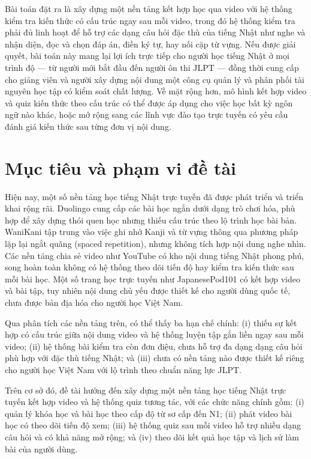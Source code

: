 \documentclass[../DoAn.tex]{subfiles}
\begin{document}
Bài toán đặt ra là xây dựng một nền tảng kết hợp học qua video với hệ thống kiểm tra kiến thức có cấu trúc ngay sau mỗi video, trong đó hệ thống kiểm tra phải đủ linh hoạt để hỗ trợ các dạng câu hỏi đặc thù của tiếng Nhật như nghe và nhận diện, đọc và chọn đáp án, điền ký tự, hay nối cặp từ vựng. Nếu được giải quyết, bài toán này mang lại lợi ích trực tiếp cho người học tiếng Nhật ở mọi trình độ — từ người mới bắt đầu đến người ôn thi JLPT — đồng thời cung cấp cho giảng viên và người xây dựng nội dung một công cụ quản lý và phân phối tài nguyên học tập có kiểm soát chất lượng. Về mặt rộng hơn, mô hình kết hợp video và quiz kiến thức theo cấu trúc có thể được áp dụng cho việc học bất kỳ ngôn ngữ nào khác, hoặc mở rộng sang các lĩnh vực đào tạo trực tuyến có yêu cầu đánh giá kiến thức sau từng đơn vị nội dung.

\section{Mục tiêu và phạm vi đề tài}
\label{section:1.2}

Hiện nay, một số nền tảng học tiếng Nhật trực tuyến đã được phát triển và triển khai rộng rãi. Duolingo cung cấp các bài học ngắn dưới dạng trò chơi hóa, phù hợp để xây dựng thói quen học nhưng thiếu cấu trúc theo lộ trình học bài bản. WaniKani tập trung vào việc ghi nhớ Kanji và từ vựng thông qua phương pháp lặp lại ngắt quãng (spaced repetition), nhưng không tích hợp nội dung nghe nhìn. Các nền tảng chia sẻ video như YouTube có kho nội dung tiếng Nhật phong phú, song hoàn toàn không có hệ thống theo dõi tiến độ hay kiểm tra kiến thức sau mỗi bài học. Một số trang học trực tuyến như JapanesePod101 có kết hợp video và bài tập, tuy nhiên nội dung chủ yếu được thiết kế cho người dùng quốc tế, chưa được bản địa hóa cho người học Việt Nam.

Qua phân tích các nền tảng trên, có thể thấy ba hạn chế chính: (i) thiếu sự kết hợp có cấu trúc giữa nội dung video và hệ thống luyện tập gắn liền ngay sau mỗi video; (ii) hệ thống bài kiểm tra còn đơn điệu, chưa hỗ trợ đa dạng dạng câu hỏi phù hợp với đặc thù tiếng Nhật; và (iii) chưa có nền tảng nào được thiết kế riêng cho người học Việt Nam với lộ trình theo chuẩn năng lực JLPT.

Trên cơ sở đó, đề tài hướng đến xây dựng một nền tảng học tiếng Nhật trực tuyến kết hợp video và hệ thống quiz tương tác, với các chức năng chính gồm: (i) quản lý khóa học và bài học theo cấp độ từ sơ cấp đến N1; (ii) phát video bài học có theo dõi tiến độ xem; (iii) hệ thống quiz sau mỗi video hỗ trợ nhiều dạng câu hỏi và có khả năng mở rộng; và (iv) theo dõi kết quả học tập và lịch sử làm bài của người dùng.
\end{document}
